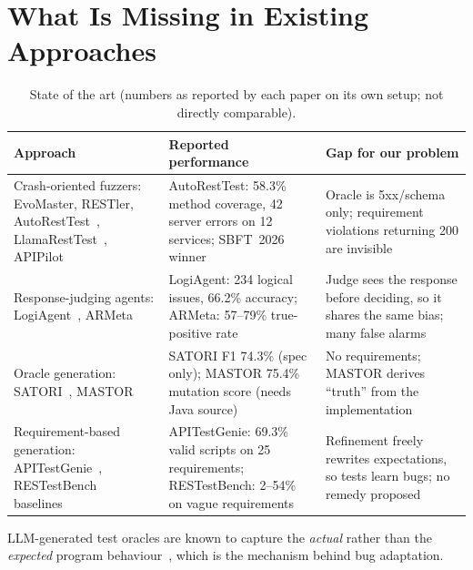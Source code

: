 \documentclass[11pt,a4paper]{article}
\begin{document}
\section{What Is Missing in Existing Approaches}
\begin{table}[H]
\centering\small
\begin{tabularx}{\linewidth}{@{}P{3.6cm}LL@{}}
\toprule
\textbf{Approach} & \textbf{Reported performance} & \textbf{Gap for our problem}\\
\midrule
Crash-oriented fuzzers: EvoMaster, RESTler, AutoRestTest~\cite{autoresttest}, LlamaRestTest~\cite{llamaresttest}, APIPilot~\cite{apipilot} & AutoRestTest: 58.3\% method coverage, 42 server errors on 12 services; SBFT~2026 winner & Oracle is 5xx/schema only; requirement violations returning 200 are invisible\\
Response-judging agents: LogiAgent~\cite{logiagent}, ARMeta~\cite{armeta} & LogiAgent: 234 logical issues, 66.2\% accuracy; ARMeta: 57--79\% true-positive rate & Judge sees the response before deciding, so it shares the same bias; many false alarms\\
Oracle generation: SATORI~\cite{satori}, MASTOR~\cite{mastor} & SATORI F1 74.3\% (spec only); MASTOR 75.4\% mutation score (needs Java source) & No requirements; MASTOR derives ``truth'' from the implementation\\
Requirement-based generation: APITestGenie~\cite{apitestgenie}, RESTestBench baselines~\cite{restestbench} & APITestGenie: 69.3\% valid scripts on 25 requirements; RESTestBench: 2--54\% on vague requirements & Refinement freely rewrites expectations, so tests learn bugs; no remedy proposed\\
\bottomrule
\end{tabularx}
\caption{State of the art (numbers as reported by each paper on its own setup; not directly comparable).}
\end{table}

\noindent LLM-generated test oracles are known to capture the \emph{actual} rather than the \emph{expected} program behaviour~\cite{konstantinou}, which is the mechanism behind bug adaptation.
\end{document}
